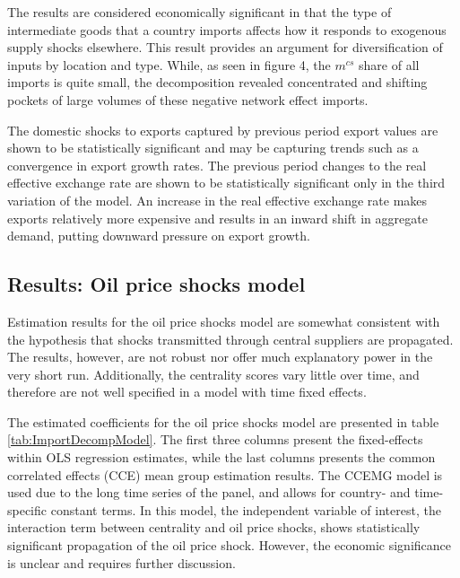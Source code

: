 \documentclass[10pt,letterpaper]{article}
\begin{document}
The results are considered economically significant in that the type of intermediate goods that a country imports affects how it responds to exogenous supply shocks elsewhere. This result provides an argument for diversification of inputs by location and type. While, as seen in figure 4, the $m^{cs}$ share of all imports is quite small, the decomposition revealed concentrated and shifting pockets of large volumes of these negative network effect imports. 

The domestic shocks to exports captured by previous period export values are shown to be statistically significant and may be capturing trends such as a convergence in export growth rates. The previous period changes to the real effective exchange rate are shown to be statistically significant only in the third variation of the model. An increase in the real effective exchange rate makes exports relatively more expensive and results in an inward shift in aggregate demand, putting downward pressure on export growth.

\subsection{Results: Oil price shocks model} \label{results_oil}

Estimation results for the oil price shocks model are somewhat consistent with the hypothesis that shocks transmitted through central suppliers are propagated. The results, however, are not robust nor offer much explanatory power in the very short run. Additionally, the centrality scores vary little over time, and therefore are not well specified in a model with time fixed effects. 

The estimated coefficients for the oil price shocks model are presented in table \ref{tab:ImportDecompModel}. The first three columns present the fixed-effects within OLS regression estimates, while the last columns presents the common correlated effects (CCE) mean group estimation results. The CCEMG model is used due to the long time series of the panel, and allows for country- and time-specific constant terms. In this model, the independent variable of interest, the interaction term between centrality and oil price shocks, shows statistically significant propagation of the oil price shock. However, the economic significance is unclear and requires further discussion. 
\end{document}
